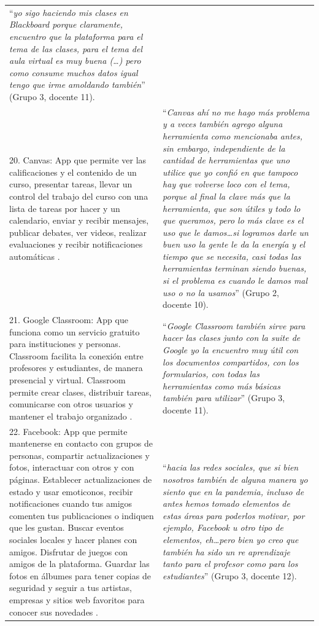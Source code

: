 \documentclass[spanish]{textolivre}
\begin{document}
\begin{longtable}{p{}p{}}
“\emph{yo sigo haciendo mis clases en Blackboard porque claramente, encuentro que la plataforma para el tema de las clases, para el tema del aula virtual es muy buena (…) pero como consume muchos datos igual tengo que irme amoldando también}” (Grupo 3, docente 11).
\\
20. Canvas: App que permite ver las calificaciones y el contenido de un curso, presentar tareas, llevar un control del trabajo del curso con una lista de tareas por hacer y un calendario, enviar y recibir mensajes, publicar debates, ver videos, realizar evaluaciones y recibir notificaciones automáticas \cite{instructure_canvas_2021}. &
“\emph{Canvas ahí no me hago más problema y  a veces también agrego alguna herramienta como mencionaba antes,  sin embargo, independiente de la cantidad de herramientas que uno utilice que yo confió en que tampoco hay que volverse loco con el tema, porque al final la clave más que la herramienta, que son útiles y todo lo que queramos, pero lo más clave es el uso que le damos…si logramos darle un buen uso la gente le da la energía y el tiempo que se necesita, casi todas las herramientas terminan siendo buenas, si el problema es cuando le damos mal uso o no la usamos}” (Grupo 2, docente 10).
\\
21. Google Classroom: App que funciona como un servicio gratuito para instituciones y personas. Classroom facilita la conexión entre profesores y estudiantes, de manera presencial y virtual. Classroom permite crear clases, distribuir tareas, comunicarse con otros usuarios y mantener el trabajo organizado \cite{google2021e}. &
“\emph{Google Classroom también sirve para hacer las clases junto con la  suite de Google yo la encuentro muy útil con los documentos compartidos, con los formularios, con todas las herramientas como más básicas también para utilizar}” (Grupo 3, docente 11).
\\
22. Facebook: App que permite mantenerse en contacto con grupos de personas, compartir actualizaciones y fotos, interactuar con otros y con páginas. Establecer actualizaciones de estado y usar emoticonos, recibir notificaciones cuando tus amigos comenten tus publicaciones o indiquen que les gustan. Buscar eventos sociales locales y hacer planes con amigos. Disfrutar de juegos con amigos de la plataforma. Guardar las fotos en álbumes para tener copias de seguridad y seguir a tus artistas, empresas y sitios web favoritos para conocer sus novedades \cite{facebook2021}. &
“\emph{hacia las redes sociales, que si bien nosotros también de alguna manera yo siento que en la pandemia, incluso de antes hemos tomado elementos de estas áreas para poderlos motivar, por ejemplo, Facebook u otro tipo de elementos, eh…pero bien yo creo que también ha sido un re aprendizaje  tanto para el profesor como para los estudiantes}” (Grupo 3, docente 12).

\end{longtable}
\end{document}
